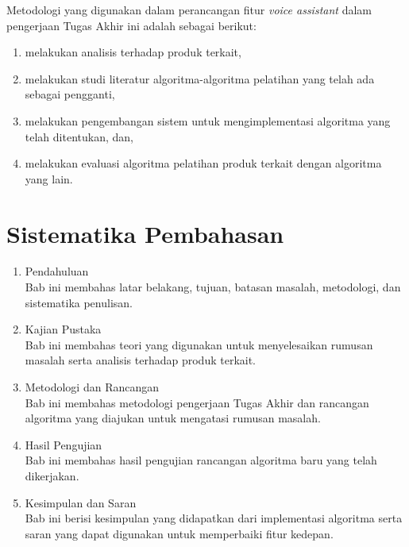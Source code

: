 Metodologi yang digunakan dalam perancangan fitur \textit{voice assistant} dalam pengerjaan Tugas Akhir ini adalah sebagai berikut:

\begin{enumerate}
	\item melakukan analisis terhadap produk terkait,
	\item melakukan studi literatur algoritma-algoritma pelatihan yang telah ada sebagai pengganti,
	\item melakukan pengembangan sistem untuk mengimplementasi algoritma yang telah ditentukan, dan,
	\item melakukan evaluasi algoritma pelatihan produk terkait dengan algoritma yang lain. 
\end{enumerate}

\section{Sistematika Pembahasan}

\begin{enumerate}[label=Bab \arabic*,itemindent=*]
	\item Pendahuluan\\
	Bab ini membahas latar belakang, tujuan, batasan masalah, metodologi, dan sistematika penulisan.
	\item Kajian Pustaka\\
	Bab ini membahas teori yang digunakan untuk menyelesaikan rumusan masalah serta analisis terhadap produk terkait.
	\item Metodologi dan Rancangan\\
	Bab ini membahas metodologi pengerjaan Tugas Akhir dan rancangan algoritma yang diajukan untuk mengatasi rumusan masalah.
	\item Hasil Pengujian\\
	Bab ini membahas hasil pengujian rancangan algoritma baru yang telah dikerjakan.
	\item Kesimpulan dan Saran\\
	Bab ini berisi kesimpulan yang didapatkan dari implementasi algoritma serta saran yang dapat digunakan untuk memperbaiki fitur kedepan.
\end{enumerate}
